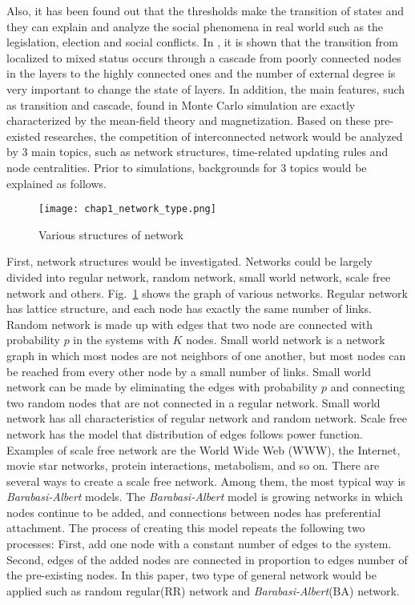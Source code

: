 Also, it has been found out that the thresholds make the transition of states and they can explain and analyze the social phenomena in real world such as the legislation, election and social conflicts.\parencite{alvarez2016, amato2017, diep2017} In \parencite{gomez2015}, it is shown that the transition from localized to mixed status occurs through a cascade from poorly connected nodes in the layers to the highly connected ones and the number of external degree is very important to change the state of layers. In addition, the main features, such as transition and cascade, found in Monte Carlo simulation are exactly characterized by the mean-field theory and magnetization\parencite{alvarez2016, diep2017, amato2017, gomez2015}. 
Based on these pre-existed researches, the competition of interconnected network would be analyzed by 3 main topics, such as network structures, time-related updating rules and node centralities. Prior to simulations, backgrounds for 3 topics would be explained as follows. 
\begin{figure}[!htb]
	\centering
	\texttt{[image: chap1\_network\_type.png]}
	\caption{Various structures of network}
	\label{chap1_network_type}
\end{figure}
First, network structures would be investigated. Networks could be largely divided into regular network, random network\parencite{erdos1960}, small world network\parencite{watts1998}, scale free network\parencite{barabasi1999} and others. Fig.~\ref{chap1_network_type} shows the graph of various networks. 
Regular network has lattice structure, and  each node has exactly the same number of links. Random network is made up with edges that two node are connected with probability $p$ in the systems with $K$ nodes. 
Small world network is a network graph in which most nodes are not neighbors of one another, but most nodes can be reached from every other node by a small number of links. Small world network can be made by eliminating the edges with probability $p$ and connecting two random nodes that are not connected in a regular network. Small world network has all characteristics of regular network and random network.
Scale free network has the model that distribution of edges follows power function. Examples of scale free network are the World Wide Web (WWW), the Internet, movie star networks, protein interactions, metabolism, and so on.
There are several ways to create a scale free network. Among them, the most typical way is \textit{Barabasi-Albert} models.
The \textit{Barabasi-Albert} model is growing networks in which nodes continue to be added, and connections between nodes has preferential attachment. The process of creating this model repeats the following two processes: First, add one node with a constant number of edges to the system. Second, edges of the added nodes are connected in proportion to edges number of the pre-existing nodes.
In this paper, two type of general network would be applied such as random regular(RR) network and \textit{Barabasi-Albert}(BA) network. 

